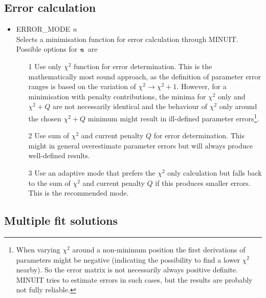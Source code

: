 \documentclass[a4paper,10pt]{article}
\def\enn{\mbox{\ttfamily\textit{n}\rmfamily}}
\def\tt{\ttfamily}
\def\rm{\rmfamily}
\begin{document}
\subsection{Error calculation}

\begin{itemize}
\item
\tt ERROR\_MODE \textit{n}\rm\\
Selects a minimisation function for error calculation through MINUIT. Possible options for $\enn$ are
\vspace{-0.5em}\begin{enumerate}
\item[1\:\:] Use only $\chi^2$ function for error determination. This is the mathematically most sound approach, as the definition of
parameter error ranges is based on the variation of $\chi^2 \rightarrow \chi^2 +1$. However, for a
minimisation with penalty contributions, the minima for $\chi^2$ only and $\chi^2+Q$ are not necessarily
identical and the behaviour of $\chi^2$ only around the chosen $\chi^2+Q$ minimum might result in ill-defined parameter
errors\footnote{When varying $\chi^2$ around a non-minimum position the first derivations of parameters might be negative
(indicating the possibility to find a lower $\chi^2$ nearby). So the error matrix is not necessarily always positive definite.
MINUIT tries to estimate errors in such cases, but the results are probably not fully reliable.}.
\item[2\:\:] Use sum of $\chi^2$ and current penalty $Q$ for error determination. This might in general overestimate
parameter errors but will always produce well-defined results.
\item[3\:\:] Use an adaptive mode that prefers the $\chi^2$ only calculation but falls back to the 
sum of $\chi^2$ and current penalty $Q$ if this produces smaller errors. This is the recommended mode.
\end{enumerate}

\end{itemize}

\subsection{Multiple fit solutions}
\end{document}
